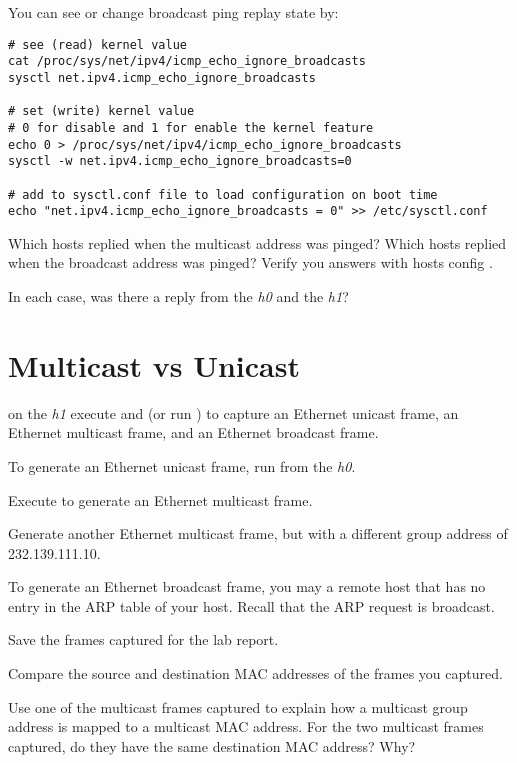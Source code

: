 \documentclass{../UTNetLab}
\begin{document}
You can see or change broadcast ping replay state by:
\begin{lstlisting}
# see (read) kernel value
cat /proc/sys/net/ipv4/icmp_echo_ignore_broadcasts
sysctl net.ipv4.icmp_echo_ignore_broadcasts

# set (write) kernel value
# 0 for disable and 1 for enable the kernel feature
echo 0 > /proc/sys/net/ipv4/icmp_echo_ignore_broadcasts
sysctl -w net.ipv4.icmp_echo_ignore_broadcasts=0

# add to sysctl.conf file to load configuration on boot time
echo "net.ipv4.icmp_echo_ignore_broadcasts = 0" >> /etc/sysctl.conf
\end{lstlisting}

\begin{report}
    \item Which hosts replied when the multicast address was pinged?
    Which hosts replied when the broadcast address was pinged?
    Verify you answers with hosts config .

    \item In each case, was there a reply from the \textit{h0} and the \textit{h1}?
\end{report}

\section{Multicast vs Unicast}
on the \textit{h1} execute  and  (or run ) to capture an Ethernet unicast frame, an Ethernet multicast frame, and an Ethernet broadcast frame.

To generate an Ethernet unicast frame, run  from the \textit{h0}.

Execute  to generate an Ethernet multicast frame.

Generate another Ethernet multicast frame, but with a different group address of {232.139.111.10}.

To generate an Ethernet broadcast frame, you may  a remote host that has no entry in the ARP table of your host.
Recall that the ARP request is broadcast.

Save the frames captured for the lab report.

\begin{report}
    \item Compare the source and destination MAC addresses of the frames you captured.

    \item Use one of the multicast frames captured to explain how a multicast group address is mapped to a multicast MAC address.
    For the two multicast frames captured, do they have the same destination MAC address?
    Why?
\end{report}
\end{document}
